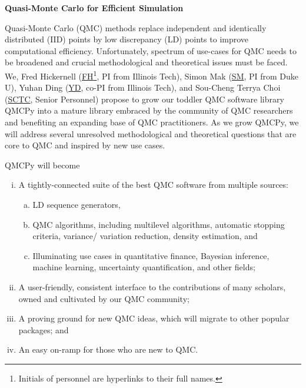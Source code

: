 \documentclass[11pt]{NSFamsart}
\newcommand{\FH}{\hyperlink{FHlink}{FH}\xspace}
\newcommand{\SM}{\hyperlink{SMlink}{SM}\xspace}
\newcommand{\SCTC}{\hyperlink{SCTClink}{SCTC}\xspace}
\newcommand{\YD}{\hyperlink{YDlink}{YD}\xspace}
\begin{document}

\begin{center}
\Large \textbf{
Quasi-Monte Carlo for Efficient Simulation
}
\end{center}
\vspace{-2ex}

\setcounter{tocdepth}{1}
\tableofcontents

\vspace{-6ex}



Quasi-Monte Carlo (QMC) methods replace independent and identically distributed (IID) points by low discrepancy (LD) points to improve computational efficiency.  Unfortunately, spectrum of use-cases for QMC needs to be broadened and crucial methodological and theoretical issues must be faced.  We, \hypertarget{FHlink}{Fred Hickernell} (\FH\footnote{Initials of personnel are hyperlinks to their full names.}, PI from Illinois Tech), \hypertarget{SMlink}{Simon Mak} (\SM, PI from Duke U), \hypertarget{YDlink}{Yuhan Ding} (\YD, co-PI from Illinois Tech), and \hypertarget{SCTClink}{Sou-Cheng Terrya Choi} (\SCTC, Senior Personnel) propose to grow our toddler QMC software library QMCPy \cite{QMCPy2020a} into a mature library embraced by the community of QMC researchers and benefiting an expanding base of QMC practitioners.  As we grow QMCPy, we will address several unresolved methodological and theoretical questions that are core to QMC and inspired by new use cases.  

QMCPy will become
\begin{enumerate}[i.]
    \item A tightly-connected suite of the best QMC software from multiple sources:
    \begin{enumerate}[a)]
        \item LD sequence generators,
        \item QMC algorithms, including multilevel algorithms, automatic stopping criteria, variance/ variation reduction, density estimation, and
        \item Illuminating use cases in quantitative finance, Bayesian inference, machine learning, uncertainty quantification, and other fields;
    \end{enumerate}
    \item A user-friendly, consistent interface to the contributions of many scholars, owned and cultivated by our QMC community;
    \item A proving ground for new QMC ideas, which will migrate to other popular packages; and
    \item An easy on-ramp for those who are new to QMC.
\end{enumerate}
\end{document}
